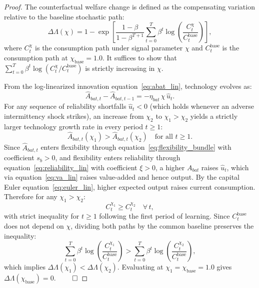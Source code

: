 	\begin{proof}
		The counterfactual welfare change is defined as the compensating variation relative to the baseline stochastic path:
		\begin{equation*}
			\Delta\Lambda(\chi) = 1 - \exp\!\left[\frac{1-\beta}{1-\beta^{T+1}} \sum_{t=0}^{T} \beta^t \log\!\left(\frac{C_t^{\chi}}{C_t^{\text{base}}}\right)\right],
		\end{equation*}
		where $C_t^{\chi}$ is the consumption path under signal parameter $\chi$ and $C_t^{\text{base}}$ is the consumption path at $\chi_{\text{base}} = 1.0$. It suffices to show that $\sum_{t=0}^{T}\beta^t \log(C_t^{\chi}/C_t^{\text{base}})$ is strictly increasing in $\chi$.

		From the log-linearized innovation equation~\eqref{eq:abat_lin}, technology evolves as:
		\begin{equation*}
			\hat{A}_{bat,t} - \hat{A}_{bat,t-1} = -\eta_{bat}\,\chi\,\hat{u}_t.
		\end{equation*}
		For any sequence of reliability shortfalls $\hat{u}_t < 0$ (which holds whenever an adverse intermittency shock strikes), an increase from $\chi_2$ to $\chi_1 > \chi_2$ yields a strictly larger technology growth rate in every period $t \geq 1$:
		\begin{equation*}
			\hat{A}_{bat,t}(\chi_1) > \hat{A}_{bat,t}(\chi_2)\quad \text{for all } t \geq 1.
		\end{equation*}
		Since $\hat{A}_{bat,t}$ enters flexibility through equation~\eqref{eq:flexibility_bundle} with coefficient $s_b > 0$, and flexibility enters reliability through equation~\eqref{eq:reliability_lin} with coefficient $\xi > 0$, a higher $A_{bat}$ raises $\hat{u}_t$, which via equation~\eqref{eq:va_lin} raises value-added and hence output. By the capital Euler equation~\eqref{eq:euler_lin}, higher expected output raises current consumption. Therefore for any $\chi_1 > \chi_2$:
		\begin{equation*}
			C_t^{\chi_1} \geq C_t^{\chi_2}\quad \forall\, t,
		\end{equation*}
		with strict inequality for $t \geq 1$ following the first period of learning. Since $C_t^{\text{base}}$ does not depend on $\chi$, dividing both paths by the common baseline preserves the inequality:
		\begin{equation*}
			\sum_{t=0}^{T}\beta^t \log\!\left(\frac{C_t^{\chi_1}}{C_t^{\text{base}}}\right) > \sum_{t=0}^{T}\beta^t \log\!\left(\frac{C_t^{\chi_2}}{C_t^{\text{base}}}\right),
		\end{equation*}
		which implies $\Delta\Lambda(\chi_1) < \Delta\Lambda(\chi_2)$. Evaluating at $\chi_1 = \chi_{\text{base}} = 1.0$ gives $\Delta\Lambda(\chi_{\text{base}}) = 0$. $\qed$
	\end{proof}

